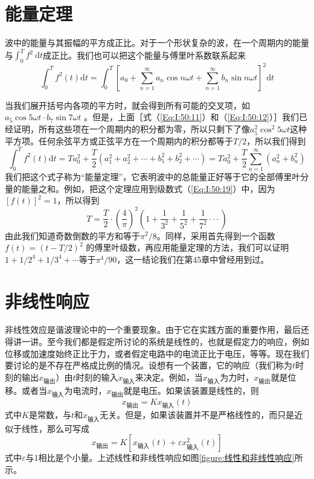 \section{能量定理}

波中的能量与其振幅的平方成正比。对于一个形状复杂的波，在一个周期内的能量与$\int_0^Tf^2~\mathrm{d}t$成正比。我们也可以把这个能量与傅里叶系数联系起来
\begin{equation}
    \label{Eq:I:50:22}
    \int_0^Tf^2\left(t\right)\mathrm{d}t=\int_0^T\left[a_0+\sum_{n=1}^\infty a_n\cos n\omega t+\sum_{n=1}^\infty b_n\sin n\omega t \right]^2\mathrm{d}t
\end{equation}

当我们展开括号内各项的平方时，就会得到所有可能的交叉项，如$a_5 \cos5\omega t\cdot b_7 \sin7\omega t$ 。但是，上面［式（\ref{Eq:I:50:11}）和（\ref{Eq:I:50:12}）］我们已经证明，所有这些项在一个周期内的积分都为零，所以只剩下了像$a_5^2\cos^2 5\omega t$这种平方项。任何余弦平方或正弦平方在一个周期内的积分都等于$T/2$，所以我们得到
\begin{equation}
    \label{Eq:I:50:23}
    \int_{0}^{T}f^{2}\left(t\right)\mathrm{d}t= Ta_{0}^{2}+\frac{T}{2}(a_{1}^{2}+a_{2}^{2}+\cdots+b_{1}^{2}+b_{2}^{2}+\cdots) = Ta_{0}^{2}+\frac{T}{2}\sum_{n=1}^{\infty}(a_{n}^{2}+b_{n}^{2})
\end{equation}
我们把这个式子称为“能量定理”，它表明波中的总能量正好等于它的全部傅里叶分量的能量之和。例如，把这个定理应用到级数式（\ref{Eq:I:50:19}）中，因为$[f(t)]^2=1$，所以得到
\begin{equation*}
    T=\frac{T}{2}\cdot\left(\frac{4}{\pi}\right)^{2}\left(1+\frac{1}{3^{2}}+\frac{1}{5^{2}}+\frac{1}{7^{2}}\cdotp\cdotp\cdotp\right)
\end{equation*}
由此我们知道奇数倒数的平方和等于$\pi^2 /8$。同样，采用首先得到一个函数$f(t)=(t-T/2)^2$ 的傅里叶级数，再应用能量定理的方法，我们可以证明$1+1/2^4 +1/3^4 +\cdots$等于$\pi^4/90$，这一结论我们在第45章中曾经用到过。

\section{非线性响应}
非线性效应是谐波理论中的一个重要现象。由于它在实践方面的重要作用，最后还得讲一讲。至今我们都是假定所讨论的系统是线性的，也就是假定力的响应，例如位移或加速度始终正比于力，或者假定电路中的电流正比于电压，等等。现在我们要讨论的是不存在严格成比例的情况。设想有一个装置，它的响应（我们称为$t$时刻的输出$x_\text{输出}$）由$t$时刻的输入$x_\text{输入}$来决定。例如，当$x_\text{输入}$为力时，$x_\text{输出}$就是位移。或者当$x_\text{输入}$为电流时，$x_\text{输出}$就是电压。如果该装置是线性的，则
\begin{equation}
    \label{Eq:I:50:24}
    x_\text{输出} = Kx_\text{输入}(t)
\end{equation}
式中$K$是常数，与$t$和$x_\text{输入}$无关。但是，如果该装置并不是严格线性的，而只是近似于线性，那么可写成
\begin{equation}
    \label{Eq:I:50:25}
    x_\text{输出} = K\left[x_\text{输入}(t) + \varepsilon x_\text{输入}^2(t)\right]
\end{equation}
式中$\varepsilon$与1相比是个小量。上述线性和非线性响应如图\ref{figure:线性和非线性响应}所示。

